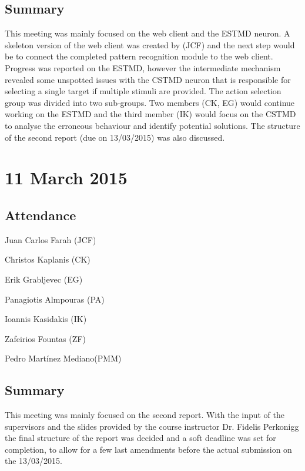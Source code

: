 \documentclass[a4paper,11pt]{article}
\begin{document}
\subsection*{Summary}
This meeting was mainly focused on the web client and the ESTMD neuron. A skeleton version of the web client was created by (JCF) and the next step would be to connect the completed pattern recognition module to the web client. Progress was reported on the ESTMD, however the intermediate mechanism revealed some unspotted issues with the CSTMD neuron that is responsible for selecting a single target if multiple stimuli are provided. The action selection group was divided into two sub-groups. Two members (CK, EG) would continue working on the ESTMD and the third member (IK) would focus on the CSTMD to analyse the erroneous behaviour and identify potential solutions. The structure of the second report (due on 13/03/2015) was also discussed.

\maketitle
\section*{11 March 2015}
\subsection*{Attendance}
\begin{compactenum}
\item Juan Carlos Farah (JCF)
\item Christos Kaplanis (CK)
\item Erik Grabljevec (EG)
\item Panagiotis Almpouras (PA)
\item Ioannis Kasidakis (IK)
\item Zafeirios Fountas (ZF)
\item Pedro Martínez Mediano(PMM)
\end{compactenum}

\subsection*{Summary}
This meeting was mainly focused on the second report. With the input of the supervisors and the slides provided by the course instructor Dr. Fidelis Perkonigg the final structure of the report was decided and a soft deadline was set for completion, to allow for a few last amendments before the actual submission on the 13/03/2015.
\end{document}
